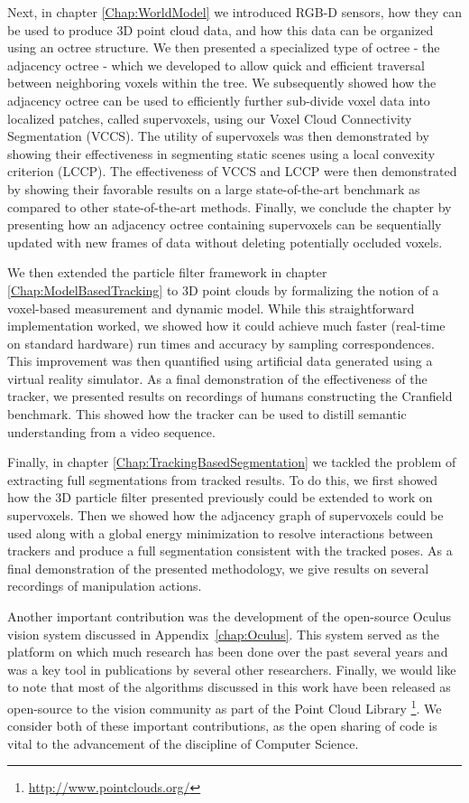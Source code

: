 Next, in chapter \ref{Chap:WorldModel} we introduced RGB-D sensors, how they can be used to produce 3D point cloud data, and how this data can be organized using an octree structure. We then presented a specialized type of octree - the adjacency octree - which we developed to allow quick and efficient traversal between neighboring voxels within the tree. We subsequently showed how the adjacency octree can be used to efficiently further sub-divide voxel data into localized patches, called supervoxels, using our Voxel Cloud Connectivity Segmentation (VCCS). The utility of supervoxels was then demonstrated by showing their effectiveness in segmenting static scenes using a local convexity criterion (LCCP). The effectiveness of VCCS and LCCP were then demonstrated by showing their favorable results on a large state-of-the-art benchmark as compared to other state-of-the-art methods. Finally, we conclude the chapter by presenting how an adjacency octree containing supervoxels can be sequentially updated with new frames of data without deleting potentially occluded voxels.

We then extended the particle filter framework in chapter \ref{Chap:ModelBasedTracking} to 3D point clouds by formalizing the notion of a voxel-based measurement and dynamic model. While this straightforward implementation worked, we showed how it could achieve much faster (real-time on standard hardware) run times and accuracy by sampling correspondences. This improvement was then quantified using artificial data generated using a virtual reality simulator. As a final demonstration of the effectiveness of the tracker, we presented results on recordings of humans constructing the Cranfield benchmark. This showed how the tracker can be used to distill semantic understanding from a video sequence. 

Finally, in chapter \ref{Chap:TrackingBasedSegmentation} we tackled the problem of extracting full segmentations from tracked results. To do this, we first showed how the 3D particle filter presented previously could be extended to work on supervoxels. Then we showed how the adjacency graph of supervoxels could be used along with a global energy minimization to resolve interactions between trackers and produce a full segmentation consistent with the tracked poses. As a final demonstration of the presented methodology, we give results on several recordings of manipulation actions. 

Another important contribution was the development of the open-source Oculus vision system discussed in Appendix~\ref{chap:Oculus}. This system served as the platform on which much research has been done over the past several years and was a key tool in publications by several other researchers. Finally, we would like to note that most of the algorithms discussed in this work have been released as open-source to the vision community as part of the Point Cloud Library \footnote{\url{http://www.pointclouds.org/}}. We consider both of these important contributions, as the open sharing of code is vital to the advancement of the discipline of Computer Science.

